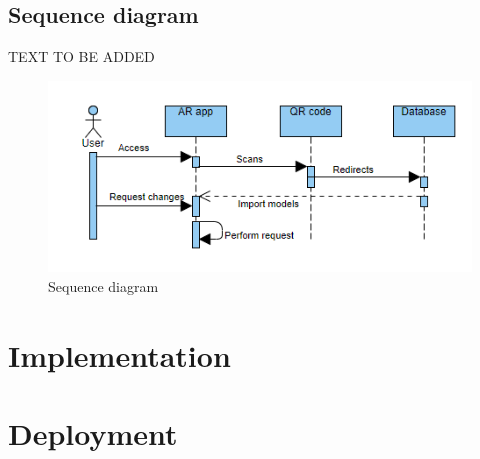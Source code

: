 \subsection*{Sequence diagram}
TEXT TO BE ADDED
\begin{figure}[h!]
    \begin{center}
        \includegraphics{img/SequenceDiagram.png}
        \caption{Sequence diagram}
        \label{fig:SequenceDiagram}
    \end{center}
\end{figure}

\section{Implementation}
\section{Deployment}
